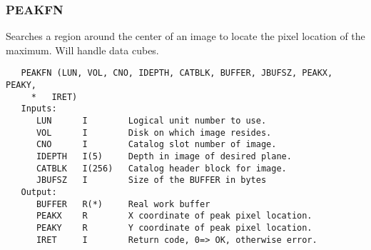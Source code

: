 \subsubsection{PEAKFN}
Searches a region around the center of an image to locate the
pixel location of the maximum.  Will handle data cubes.
\begin{verbatim}
   PEAKFN (LUN, VOL, CNO, IDEPTH, CATBLK, BUFFER, JBUFSZ, PEAKX, PEAKY,
     *   IRET)
   Inputs:
      LUN      I        Logical unit number to use.
      VOL      I        Disk on which image resides.
      CNO      I        Catalog slot number of image.
      IDEPTH   I(5)     Depth in image of desired plane.
      CATBLK   I(256)   Catalog header block for image.
      JBUFSZ   I        Size of the BUFFER in bytes
   Output:
      BUFFER   R(*)     Real work buffer
      PEAKX    R        X coordinate of peak pixel location.
      PEAKY    R        Y coordinate of peak pixel location.
      IRET     I        Return code, 0=> OK, otherwise error.

\end{verbatim}
